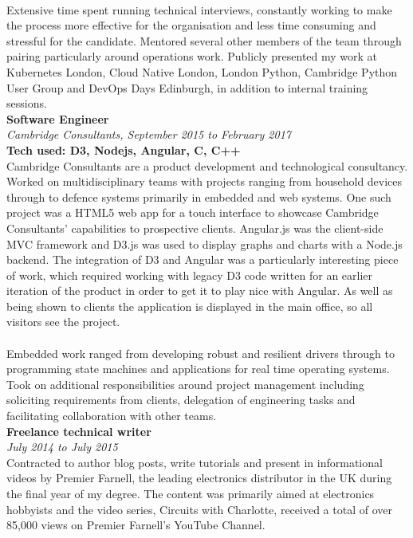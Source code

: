 \documentclass{article}
\begin{document}
\begin{flushleft}
\paragraph{}Extensive time spent running technical interviews, constantly working to make the process more effective for the organisation and less time consuming and stressful for the candidate. Mentored several other members of the team through pairing particularly around operations work. Publicly presented my work at Kubernetes London, Cloud Native London, London Python, Cambridge Python User Group and DevOps Days Edinburgh, in addition to internal training sessions.\\[10pt]

\textbf{Software Engineer}\\
\textit{Cambridge Consultants, September 2015 to February 2017}\\
\textbf{Tech used: D3, Nodejs, Angular, C, C++}\\[5pt]
Cambridge Consultants are a product development and technological consultancy. Worked on multidisciplinary teams with projects ranging from household devices through to defence systems primarily in embedded and web systems. One such project was a HTML5 web app for a touch interface to showcase Cambridge Consultants' capabilities to prospective clients. Angular.js was the client-side MVC framework and D3.js was used to display graphs and charts with a Node.js backend. The integration of D3 and Angular was a particularly interesting piece of work, which required working with legacy D3 code written for an earlier iteration of the product in order to get it to play nice with Angular. As well as being shown to clients the application is displayed in the main office, so all visitors see the project.

\paragraph{}Embedded work ranged from developing robust and resilient drivers through to programming state machines and applications for real time operating systems. Took on additional responsibilities around project management including soliciting requirements from clients, delegation of engineering tasks and facilitating collaboration with other teams.\\[10pt]

\textbf{Freelance technical writer}\\
\textit{July 2014 to July 2015}\\[5pt]
Contracted to author blog posts, write tutorials and present in informational videos by Premier Farnell, the leading electronics distributor in the UK during the final year of my degree. The content was primarily aimed at electronics hobbyists and the video series, Circuits with Charlotte, received a total of over 85,000 views on Premier Farnell's YouTube Channel.


\end{flushleft}
\end{document}
